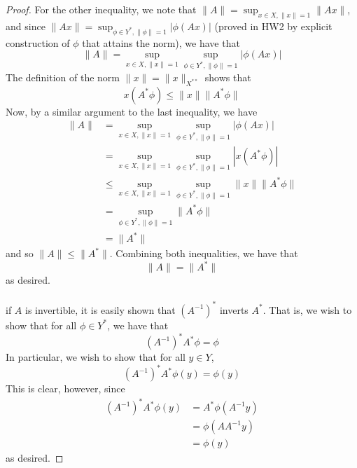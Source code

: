 \documentclass[fontsize=11pt]{scrartcl} %
\numberwithin{equation}{section} %
\numberwithin{figure}{section} %
\numberwithin{table}{section} %
\begin{document}
\begin{proof}
    For the other inequality, we note that $\|A\| = \sup_{x\in
    X,\|x\|=1}\|Ax\|$, and since $\|Ax\| = \sup_{\phi\in
    Y^*,\|\phi\|=1}|\phi(Ax)|$ (proved in HW2 by explicit construction of
    $\phi$ that attains the norm), we have that
    \[
        \|A\| = \sup_{x\in X,\|x\|=1}\sup_{\phi\in Y^*,\|\phi\|=1} |\phi(Ax)|
    \]
    The definition of the norm $\|x\| = \|x\|_{X^{**}}$ shows that
    \[
        x(A^*\phi) \leq \|x\|\|A^*\phi\|
    \]
    Now, by a similar argument to the last inequality, we have
    \[
        \begin{aligned}
            \|A\| &= \sup_{x\in X,\|x\|=1}\sup_{\phi\in Y^*,\|\phi\|=1}
            |\phi(Ax)|\\
            &= \sup_{x\in X,\|x\|=1}\sup_{\phi\in Y^*,\|\phi\|=1}
            |x(A^*\phi)|\\
            &\leq \sup_{x\in X,\|x\|=1}\sup_{\phi\in Y^*,\|\phi\|=1}
            \|x\|\|A^*\phi\|\\
            &=\sup_{\phi\in Y^*,\|\phi\|=1}\|A^*\phi\|\\
            &=\|A^*\|
        \end{aligned}
    \]
    and so $\|A\|\leq \|A^*\|$. Combining both inequalities, we have that
    \[
        \|A\|=\|A^*\|
    \]
    as desired.
    \\
    \\
    if $A$ is invertible, it is easily shown that $(A^{-1})^*$ inverts $A^*$.
    That is, we wish to show that for all $\phi\in Y^*$, we have that
    \[
        (A^{-1})^*A^*\phi = \phi
    \]
    In particular, we wish to show that for all $y\in Y$,
    \[
        (A^{-1})^*A^*\phi(y) = \phi(y)
    \]
    This is clear, however, since
    \[
        \begin{aligned}
            (A^{-1})^*A^*\phi(y) &= A^*\phi(A^{-1}y)\\
                &= \phi(AA^{-1}y)\\
                &=\phi(y)
        \end{aligned}
    \]
    as desired.
\end{proof}

\newpage
\end{document}
